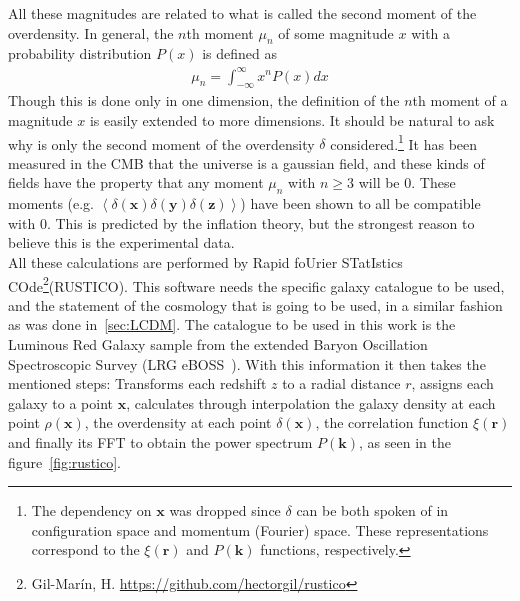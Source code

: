 All these magnitudes are related to what is called the second moment of the overdensity. In general, the $n$th moment $\mu_n$ of some magnitude $x$ with a probability distribution $P(x)$ is defined as 
\begin{align}
	\mu_n = \int_{-\infty}^{\infty} x^{n}P(x)dx 
	\label{eq:n-moment}
\end{align}
Though this is done only in one dimension, the definition of the $n$th moment of a magnitude $x$ is easily extended to more dimensions.
It should be natural to ask why is only the second moment of the overdensity $\delta$ considered.\footnote{The dependency on $\textbf{x}$ was dropped since $\delta$ can be both spoken of in configuration space and momentum (Fourier) space. These representations correspond to the $\xi(\textbf{r})$ and $P(\textbf{k})$ functions, respectively.}
It has been measured in the CMB that the universe is a gaussian field, and these kinds of fields have the property that any moment $\mu_n$ with $n\ge3$ will be 0. These moments (e.g. $ \left<\delta(\textbf{x}) \delta(\textbf{y}) \delta(\textbf{z}) \right>$) have been shown to all be compatible with 0. This is predicted by the inflation theory, but the strongest reason to believe this is the experimental data. \\

All these calculations are performed by Rapid foUrier STatIstics COde\footnote{Gil-Marín, H. \url{https://github.com/hectorgil/rustico}}(RUSTICO). This software needs the specific galaxy catalogue to be used, and the statement of the cosmology that is going to be used, in a similar fashion as was done in~\ref{sec:LCDM}. The catalogue to be used in this work is the Luminous Red Galaxy sample from the extended Baryon Oscillation Spectroscopic Survey (LRG eBOSS~\cite{eBoss}).
With this information it then takes the mentioned steps: Transforms each redshift $z$ to a radial distance $r$, assigns each galaxy to a point $\textbf{x}$, calculates through interpolation the galaxy density at each point $\rho\left(  \textbf{x}\right)$, the overdensity at each point $\delta\left( \textbf{x} \right)$, the correlation function $\xi(\textbf{r})$ and finally its FFT to obtain the power spectrum $P(\textbf{k})$, as seen in the figure~\ref{fig:rustico}. \\


